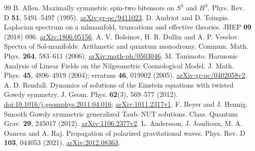 \documentclass[11pt,a4paper]{article}
\begin{document}
\begin{thebibliography}{99}
 B. Allen. Maximally symmetric spin-two bitensors on $S^3$ and $H^3$. Phys. Rev. D \textbf{51}, 5491--5497 (1995). \href{https://arxiv.org/abs/gr-qc/9411023}{arXiv:gr-qc/9411023}.
 D. Andriot and D. Tsimpis. Laplacian spectrum on a nilmanifold, truncations and effective theories. JHEP \textbf{09} (2018) 096. \href{https://arxiv.org/abs/1806.05156}{arXiv:1806.05156}.
 A. V. Bolsinov, H. R. Dullin and A. P. Veselov. Spectra of Sol-manifolds: Arithmetic and quantum monodromy. Commun. Math. Phys. \textbf{264}, 583--611 (2006). \href{https://arxiv.org/abs/math-ph/0503046}{arXiv:math-ph/0503046}.
 M. Tanimoto. Harmonic Analysis of Linear Fields on the Nilgeometric Cosmological Model. J. Math. Phys. \textbf{45}, 4896--4919 (2004); erratum \textbf{46}, 019902 (2005). \href{https://arxiv.org/abs/gr-qc/0402058v2}{arXiv:gr-qc/0402058v2}.
 A. D. Rendall. Dynamics of solutions of the Einstein equations with twisted Gowdy symmetry. J. Geom. Phys. \textbf{62}(3), 569--577 (2012). \href{https://doi.org/10.1016/j.geomphys.2011.04.016}{doi:10.1016/j.geomphys.2011.04.016}; \href{https://arxiv.org/abs/1011.2317v1}{arXiv:1011.2317v1}.
 F. Beyer and J. Hennig. Smooth Gowdy symmetric generalized Taub--NUT solutions. Class. Quantum Grav. \textbf{29}, 245017 (2012). \href{https://arxiv.org/abs/1106.2377v2}{arXiv:1106.2377v2}.
 L. Andersson, J. Joudioux, M. A. Oancea and A. Raj. Propagation of polarized gravitational waves. Phys. Rev. D \textbf{103}, 044053 (2021). \href{https://arxiv.org/abs/2012.08363}{arXiv:2012.08363}.
\end{thebibliography}
\end{document}
